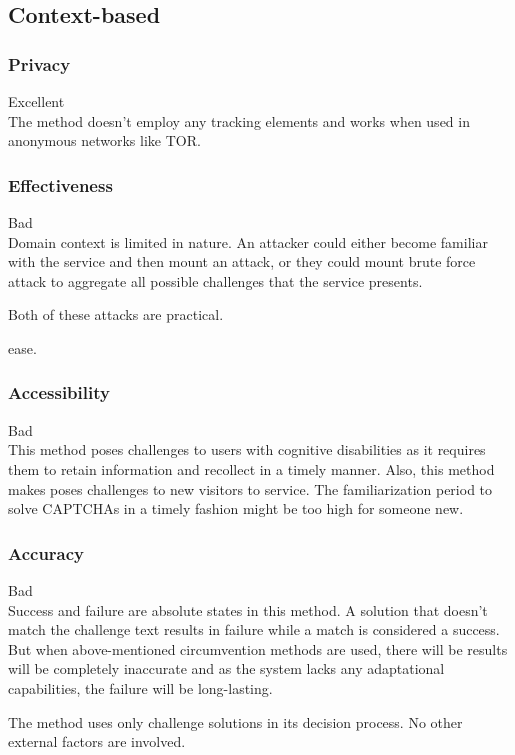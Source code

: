 \subsection{Context-based}

\subsubsection{Privacy}
Excellent\\
The method doesn't employ any tracking elements and works when used in anonymous
networks like TOR\@.

\subsubsection{Effectiveness}
Bad\\

Domain context is limited in nature. An attacker could either become familiar
with the service and then mount an attack, or they could mount brute force attack
to aggregate all possible challenges that the service presents.

Both of these attacks are practical.

ease.
\subsubsection{Accessibility}
Bad\\

This method poses challenges to users with cognitive disabilities as it requires
them to retain information and recollect in a timely manner. Also, this method
makes poses challenges to new visitors to service. The familiarization period to
solve CAPTCHAs in a timely fashion might be too high for someone new.

\subsubsection{Accuracy}
Bad\\
Success and failure are absolute states in this method. A solution that doesn't
match the challenge text results in failure while a match is considered a
success. But when above-mentioned circumvention methods are used, there will be
results will be completely inaccurate and as the system lacks any adaptational
capabilities, the failure will be long-lasting.  

The method uses only challenge solutions in its decision process. No other
external factors are involved.
